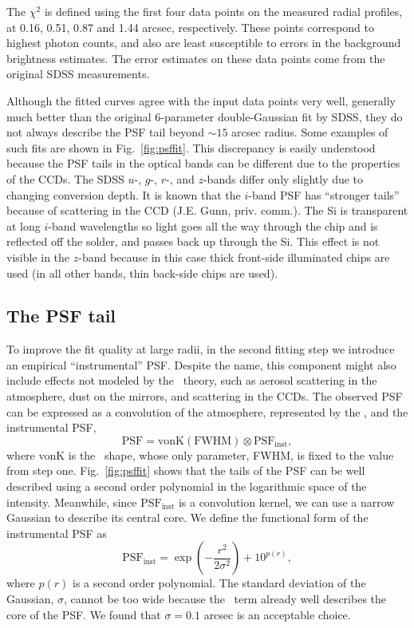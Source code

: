 The $\chi^2$ is defined using the first four data points on the
measured radial profiles, at 0.16, 0.51, 0.87 and 1.44 arcsec,
respectively. These points correspond to highest photon counts, and 
also are least susceptible to errors in the background brightness
estimates. 
The error estimates on these data points come from the original SDSS measurements.

Although the fitted
curves agree with the input data points very well, generally much better than the
original 6-parameter double-Gaussian fit by SDSS, they do not always describe
the PSF tail beyond $\sim 15$ arcsec radius. 
Some examples of such fits are shown in Fig.~\ref{fig:psffit}.
This discrepancy is easily understood
because the PSF tails in the optical bands can be 
different due to the properties of the CCDs.
The SDSS $u$-, $g$-, $r$-, and $z$-bands differ only slightly due to
changing conversion depth. It is known that the $i$-band PSF has ``stronger tails''
because of scattering in the CCD (J.E. Gunn, priv. comm.). The Si is transparent at long $i$-band wavelengths 
so light goes all the way through the chip and is reflected off the solder, and passes 
back up through the Si. This effect is not visible in the $z$-band because in this case
thick front-side illuminated chips are used (in all other bands, thin back-side chips are used). 



\subsection{The PSF tail \label{sec:instrPSF}} 

To improve the fit quality at large radii, in the second fitting step we introduce an
empirical ``instrumental'' PSF. Despite the name, this component might also include 
effects not modeled by the \vk~theory, such as aerosol scattering in the atmosphere,
dust on the mirrors, and scattering in the CCDs. The observed PSF can be expressed 
as a convolution of the atmosphere, represented 
by the \vk, and the instrumental PSF,
\begin{equation}
        \textrm{PSF} = \textrm{vonK} (\textrm{FWHM}) \otimes
        \textrm{PSF}_{\textrm{inst}},
\label{eq:conv}
\end{equation} 
where vonK is the \vk~shape, whose only parameter, FWHM, is fixed to
the value from step one.
Fig.~\ref{fig:psffit} shows that the tails of the PSF can be well
described using a second order polynomial in the logarithmic space of
the intensity.
Meanwhile, since $\textrm{PSF}_{\textrm{inst}}$ is a convolution
kernel, we can use a narrow Gaussian to describe its central core.
We define the functional form of the instrumental PSF as
\begin{equation}
        \textrm{PSF}_{\textrm{inst}} = \exp(-\frac{r^2}{2\sigma^2}) + 10^{p(r)},
\label{eq:psfinst}
\end{equation} 
where $p(r)$ is a second order polynomial.
The standard deviation of the Gaussian, $\sigma$, cannot be
too wide because the \vk~term already well describes the core of the
PSF.
We found that $\sigma = 0.1$ arcsec is an acceptable choice.

